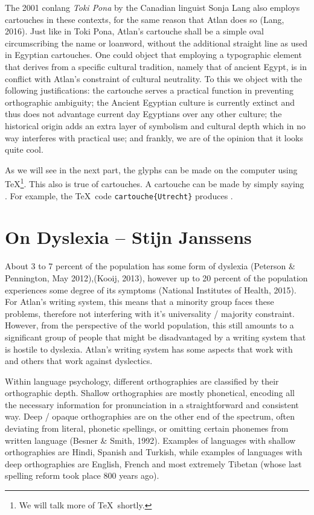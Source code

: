 The 2001 conlang {\it Toki Pona} by the Canadian linguist Sonja Lang also employs cartouches in these contexts, for the same reason that Atlan does so (Lang, 2016). Just like in Toki Pona, Atlan’s cartouche shall be a simple oval circumscribing the name or loanword, without the additional straight line as used in Egyptian cartouches. One could object that employing a typographic element that derives from a specific cultural tradition, namely that of ancient Egypt, is in conflict with Atlan’s constraint of cultural neutrality. To this we object with the following justifications: the cartouche serves a practical function in preventing orthographic ambiguity; the Ancient Egyptian culture is currently extinct and thus does not advantage current day Egyptians over any other culture; the historical origin adds an extra layer of symbolism and cultural depth which in no way interferes with practical use; and frankly, we are of the opinion that it looks quite cool. 

As we will see in the next part, the glyphs can be made on the computer using \TeX\footnote{We will talk more of \TeX\ shortly.}. This also is true of cartouches. A cartouche can be made by simply saying . For example, the \TeX\ code  {\tt {}cartouche\{Utrecht\}} produces \footnotemark.


 


\section{On Dyslexia -- {\small Stijn Janssens}}

About 3 to 7 percent of the population has some form of dyslexia (Peterson \& Pennington, May 2012),(Kooij, 2013), however up to 20 percent of the population experiences some degree of its symptoms (National Institutes of Health, 2015). For Atlan’s writing system, this means that a minority group faces these problems, therefore not interfering with it’s universality / majority constraint. However, from the perspective of the world population, this still amounts to a significant group of people that might be disadvantaged by a writing system that is hostile to dyslexia. Atlan’s writing system has some aspects that work with and others that work against dyslectics.  

Within language psychology, different orthographies are classified by their orthographic depth. Shallow orthographies are mostly phonetical, encoding all the necessary information for pronunciation in a straightforward and consistent way. Deep / opaque orthographies are on the other end of the spectrum, often deviating from literal, phonetic spellings, or omitting certain phonemes from written language (Besner \& Smith, 1992). Examples of languages with shallow orthographies are Hindi, Spanish and Turkish, while examples of languages with deep orthographies are English, French and most extremely Tibetan (whose last spelling reform took place 800 years ago).  

